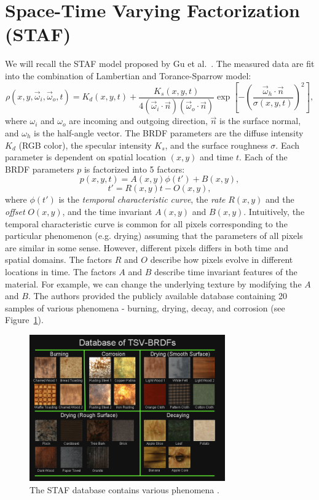 \documentclass[11pt]{article}
\begin{document}
\section{Space-Time Varying Factorization (STAF)}
We will recall the STAF model proposed by Gu et al.~\cite{Gu2006}. The measured data are fit into the combination of Lambertian and Torance-Sparrow model:
\begin{equation}
\rho(x,y,\vec{\omega}_i, \vec{\omega}_o, t) = K_d(x,y,t) + \frac{K_s(x,y,t)}{4(\vec{\omega}_i \cdot \vec{n})(\vec{\omega}_o \cdot \vec{n})}\exp\left[-\left(\frac{\vec{\omega}_h \cdot \vec{n}}{\sigma(x,y,t)}\right)^2\right],
\end{equation}
where $\omega_i$ and $\omega_o$ are incoming and outgoing direction, $\vec{n}$ is the surface normal, and $\omega_h$ is the half-angle vector. The BRDF parameters are the diffuse intensity $K_d$ (RGB color), the specular intensity $K_s$, and the surface roughness $\sigma$. Each parameter is dependent on spatial location $(x,y)$ and time $t$. Each of the BRDF parameters $p$ is factorized into 5 factors:
\begin{equation}
p(x,y,t) = A(x,y)\phi(t')+B(x,y),
\end{equation}
\begin{equation}
t'=R(x,y)t-O(x,y),
\end{equation}
where $\phi(t')$ is the \emph{temporal characteristic curve}, the \emph{rate} $R(x,y)$ and the \emph{offset} $O(x,y)$, and the time invariant $A(x,y)$ and $B(x,y)$. Intuitively, the temporal characteristic curve is common for all pixels corresponding to the particular  phenomenon (e.g. drying) assuming that the parameters of all pixels are similar in some sense. However, different pixels differs in both time and spatial domains. The factors $R$ and $O$ describe how pixels evolve in different locations in time. The factors $A$ and $B$ describe time invariant features of the material. For example, we can change the underlying texture by modifying the $A$ and $B$. The authors provided the publicly available database containing 20 samples of various phenomena - burning, drying, decay, and corrosion (see Figure~\ref{Fig:Database}). 

\begin{figure}[htb] 
\begin{center}
\includegraphics[width=0.75\textwidth]{figures/database}
\end{center}
\caption{The STAF database contains various phenomena \cite{Gu2006}.}
\label{Fig:Database}
\end{figure}
\end{document}
